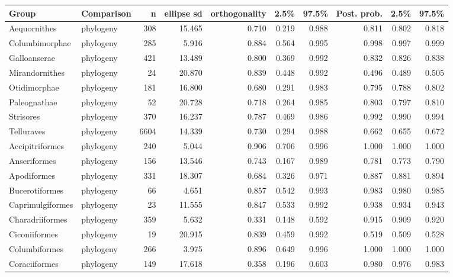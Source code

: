 \begin{table}[ht]
\centering
\scriptsize
\begin{tabular}{llrrrrrrrr}
  \hline
Group & Comparison & n & ellipse sd & orthogonality & 2.5\% & 97.5\% & Post. prob. & 2.5\% & 97.5\% \\ 
  \hline
Aequornithes & phylogeny &  308 & 15.465 & 0.710 & 0.219 & 0.988 & 0.811 & 0.802 & 0.818 \\ 
  Columbimorphae & phylogeny &  285 & 5.916 & 0.884 & 0.564 & 0.995 & 0.998 & 0.997 & 0.999 \\ 
  Galloanserae & phylogeny &  421 & 13.489 & 0.800 & 0.369 & 0.992 & 0.832 & 0.826 & 0.838 \\ 
  Mirandornithes & phylogeny &   24 & 20.870 & 0.839 & 0.448 & 0.992 & 0.496 & 0.489 & 0.505 \\ 
  Otidimorphae & phylogeny &  181 & 16.800 & 0.680 & 0.291 & 0.983 & 0.795 & 0.788 & 0.802 \\ 
  Paleognathae & phylogeny &   52 & 20.728 & 0.718 & 0.264 & 0.985 & 0.803 & 0.797 & 0.810 \\ 
  Strisores & phylogeny &  370 & 16.237 & 0.787 & 0.469 & 0.986 & 0.992 & 0.990 & 0.994 \\ 
  Telluraves & phylogeny & 6604 & 14.339 & 0.730 & 0.294 & 0.988 & 0.662 & 0.655 & 0.672 \\ 
  Accipitriformes & phylogeny &  240 & 5.044 & 0.906 & 0.706 & 0.996 & 1.000 & 1.000 & 1.000 \\ 
  Anseriformes & phylogeny &  156 & 13.546 & 0.743 & 0.167 & 0.989 & 0.781 & 0.773 & 0.790 \\ 
  Apodiformes & phylogeny &  331 & 18.307 & 0.684 & 0.326 & 0.971 & 0.887 & 0.881 & 0.894 \\ 
  Bucerotiformes & phylogeny &   66 & 4.651 & 0.857 & 0.542 & 0.993 & 0.983 & 0.980 & 0.985 \\ 
  Caprimulgiformes & phylogeny &   23 & 11.555 & 0.847 & 0.533 & 0.992 & 0.938 & 0.934 & 0.943 \\ 
  Charadriiformes & phylogeny &  359 & 5.632 & 0.331 & 0.148 & 0.592 & 0.915 & 0.909 & 0.920 \\ 
  Ciconiiformes & phylogeny &   19 & 20.915 & 0.839 & 0.459 & 0.992 & 0.519 & 0.509 & 0.528 \\ 
  Columbiformes & phylogeny &  266 & 3.975 & 0.896 & 0.649 & 0.996 & 1.000 & 1.000 & 1.000 \\ 
  Coraciiformes & phylogeny &  149 & 17.618 & 0.358 & 0.196 & 0.603 & 0.980 & 0.976 & 0.983 \\ 

\end{tabular}
\end{table}
